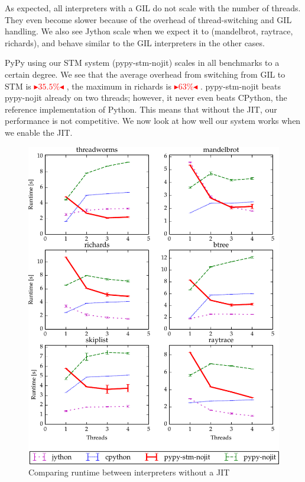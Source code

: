 \documentclass{sigplanconf}
\newcommand{\mynote}[2]{%
  \textcolor{red}{%
    \fbox{\bfseries\sffamily\scriptsize#1}%
    {\small$\blacktriangleright$\textsf{\emph{#2}}$\blacktriangleleft$}%
  }%
}
\newcommand\remi[1]{\mynote{Remi}{#1}}
\begin{document}
As expected, all interpreters with a GIL do not scale with the number
of threads. They even become slower because of the overhead of
thread-switching and GIL handling. We also see Jython scale when we
expect it to (mandelbrot, raytrace, richards), and behave similar to
the GIL interpreters in the other cases.

PyPy using our STM system (pypy-stm-nojit) scales in all benchmarks to
a certain degree. We see that the average overhead from switching from
GIL to STM is \remi{$35.5\%$}, the maximum in richards is
\remi{$63\%$}. pypy-stm-nojit beats pypy-nojit already on two threads;
however, it never even beats CPython, the reference implementation of
Python. This means that without the JIT, our performance is not
competitive. We now look at how well our system works when we enable
the JIT.

\begin{figure}[h]
  \centering
  \includegraphics[width=1\columnwidth]{plots/performance_nojit.pdf}
  \caption{Comparing runtime between interpreters without a JIT\label{fig:performance-nojit}}
\end{figure}
\end{document}
